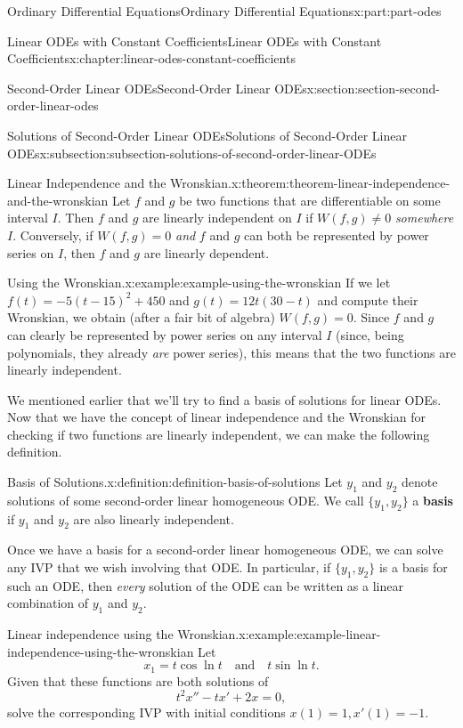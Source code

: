 \documentclass[oneside,10pt,]{book}
\newcommand{\terminology}[1]{\textbf{#1}}
\numberwithin{equation}{part}
\begin{document}
\begin{partptx}{Ordinary Differential Equations}{}{Ordinary Differential Equations}{}{}{x:part:part-odes}
\begin{chapterptx}{Linear ODEs with Constant Coefficients}{}{Linear ODEs with Constant Coefficients}{}{}{x:chapter:linear-odes-constant-coefficients}
\begin{sectionptx}{Second-Order Linear ODEs}{}{Second-Order Linear ODEs}{}{}{x:section:section-second-order-linear-odes}
\begin{subsectionptx}{Solutions of Second-Order Linear ODEs}{}{Solutions of Second-Order Linear ODEs}{}{}{x:subsection:subsection-solutions-of-second-order-linear-ODEs}
\begin{theorem}{Linear Independence and the Wronskian.}{}{x:theorem:theorem-linear-independence-and-the-wronskian}
Let \(f\) and \(g\) be two functions that are differentiable on some interval \(I\). Then \(f\) and \(g\) are linearly independent on \(I\) if \(W(f,g) \neq 0\) \emph{somewhere} \(I\). Conversely, if \(W(f,g) = 0\) \emph{and} \(f\) and \(g\) can both be represented by power series on \(I\), then \(f\) and \(g\) are linearly dependent.%
\end{theorem}
\begin{example}{Using the Wronskian.}{x:example:example-using-the-wronskian}%
If we let \(f(t) = -5(t-15)^{2} + 450\) and \(g(t) = 12t(30-t)\) and compute their Wronskian, we obtain (after a fair bit of algebra) \(W(f,g) = 0\). Since \(f\) and \(g\) can clearly be represented by power series on any interval \(I\) (since, being polynomials, they already \emph{are} power series), this means that the two functions are linearly independent.%
\end{example}
We mentioned earlier that we'll try to find a basis of solutions for linear ODEs. Now that we have the concept of linear independence and the Wronskian for checking if two functions are linearly independent, we can make the following definition.%
\begin{definition}{Basis of Solutions.}{x:definition:definition-basis-of-solutions}%
%
Let \(y_{1}\) and \(y_{2}\) denote solutions of some second-order linear homogeneous ODE. We call \(\{y_{1},y_{2}\}\) a \terminology{basis} if \(y_{1}\) and \(y_{2}\) are also linearly independent.%
\end{definition}
Once we have a basis for a second-order linear homogeneous ODE, we can solve any IVP that we wish involving that ODE. In particular, if \(\{y_{1},y_{2}\}\) is a basis for such an ODE, then \emph{every} solution of the ODE can be written as a linear combination of \(y_{1}\) and \(y_{2}\).%
\begin{example}{Linear independence using the Wronskian.}{x:example:example-linear-independence-using-the-wronskian}%
Let%
\begin{equation*}
x_{1} = t\cos\ln t\quad\text{and}\quad t\sin\ln t.
\end{equation*}
Given that these functions are both solutions of%
\begin{equation*}
t^{2}x'' - tx' + 2x = 0,
\end{equation*}
solve the corresponding IVP with initial conditions \(x(1) = 1, x'(1) = -1\).%
\par\smallskip%

\end{example}
\end{subsectionptx}
\end{sectionptx}
\end{chapterptx}
\end{partptx}
\end{document}
